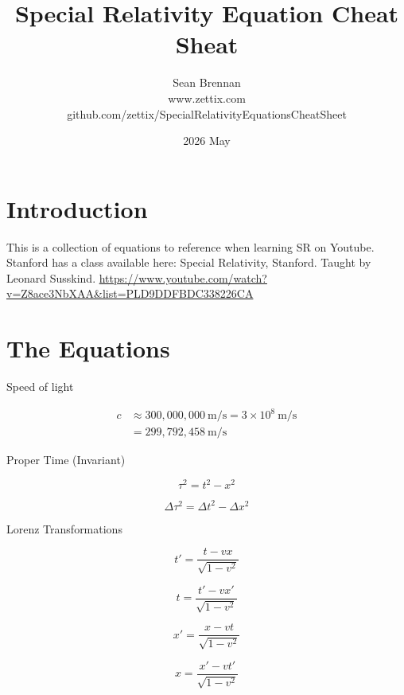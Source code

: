 \documentclass{article}
\title{Special Relativity Equation Cheat Sheat}
\date{2026 May}
\author{Sean Brennan \\ www.zettix.com \\ github.com/zettix/SpecialRelativityEquationsCheatSheet}
\begin{document}
\maketitle

\section{Introduction}
This is a collection of equations to reference when learning SR on Youtube.
Stanford has a class available here: Special Relativity, Stanford.
Taught by Leonard Susskind.
\url{https://www.youtube.com/watch?v=Z8ace3NbXAA&list=PLD9DDFBDC338226CA}

\section{The Equations}

Speed of light

\begin{equation}
\begin{split}
c &\approx 300,000,000\:\si{\meter/\second} = 3 \times 10^8\:\si{\meter/\second}\\
&= 299,792,458\:\si{\meter/\second} 
\end{split}
\end{equation}

Proper Time (Invariant)

\begin{equation}
\tau^2 = t^2 - x^2
\end{equation}

\begin{equation}
\Delta \tau^2 = \Delta t^2 - \Delta x^2
\end{equation}

Lorenz Transformations

\begin{equation}
t' = \frac{t - vx}{\sqrt{1 - v^2}}
\end{equation}

\begin{equation}
t = \frac{t' - vx'}{\sqrt{1 - v^2}}
\end{equation}

\begin{equation}
x' = \frac{x - vt}{\sqrt{1 - v^2}}
\end{equation}

\begin{equation}
x = \frac{x' - vt'}{\sqrt{1 - v^2}}
\end{equation}
\end{document}
